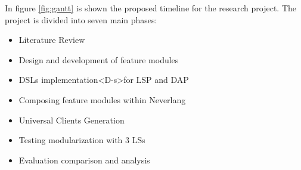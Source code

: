 In figure \ref{fig:gantt} is shown the proposed timeline for the research project. The project is divided into seven main phases:
\begin{itemize}
    \item Literature Review
    \item Design and development of feature modules
    \item DSLs implementation<D-s>for LSP and DAP
    \item Composing feature modules within Neverlang
    \item Universal Clients Generation
    \item Testing modularization with 3 LSs
    \item Evaluation comparison and analysis
\end{itemize}

